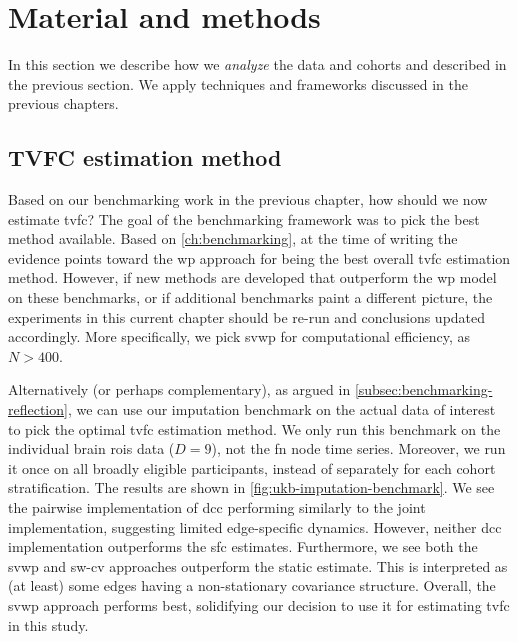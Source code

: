 \clearpage
\section{Material and methods}\label{sec:ukb-methodology}

In this section we describe how we \emph{analyze} the data and cohorts and described in the previous section.
We apply techniques and frameworks discussed in the previous chapters.

\subsection{TVFC estimation method}

Based on our benchmarking work in the previous chapter, how should we now estimate \gls{tvfc}?
The goal of the benchmarking framework was to pick the best method available.
Based on \cref{ch:benchmarking}, at the time of writing the evidence points toward the \gls{wp} approach for being the best overall \gls{tvfc} estimation method.
However, if new methods are developed that outperform the \gls{wp} model on these benchmarks, or if additional benchmarks paint a different picture, the experiments in this current chapter should be re-run and conclusions updated accordingly.
More specifically, we pick \gls{svwp} for computational efficiency, as $N > 400$.

Alternatively (or perhaps complementary), as argued in \cref{subsec:benchmarking-reflection}, we can use our imputation benchmark on the actual data of interest to pick the optimal \gls{tvfc} estimation method.
We only run this benchmark on the individual brain \glspl{roi} data ($D = 9$), not the \gls{fn} node time series.
Moreover, we run it once on all broadly eligible participants, instead of separately for each cohort stratification.
%
The results are shown in \cref{fig:ukb-imputation-benchmark}.
We see the pairwise implementation of \gls{dcc} performing similarly to the joint implementation, suggesting limited edge-specific dynamics.
However, neither \gls{dcc} implementation outperforms the \gls{sfc} estimates.
Furthermore, we see both the \gls{svwp} and \gls{sw-cv} approaches outperform the static estimate.
This is interpreted as (at least) some edges having a non-stationary covariance structure.
Overall, the \gls{svwp} approach performs best, solidifying our decision to use it for estimating \gls{tvfc} in this study.


